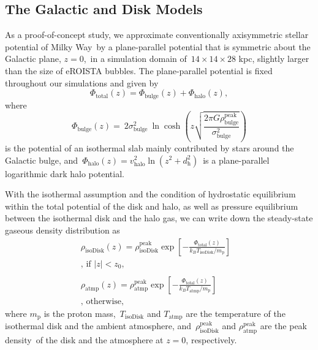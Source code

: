 \documentclass[fleqn,usenatbib,useAMS]{mnras}
\begin{document}
  \subsection{The Galactic and Disk Models} \label{sec:model}
  As a proof-of-concept study, we approximate conventionally axisymmetric stellar potential of Milky Way\
  by a plane-parallel potential that is symmetric about the Galactic plane, $z=0$,\
  in a simulation domain of\
  $14\times14\times28$ kpc, slightly larger than the size of eROISTA bubbles. The plane-parallel potential is fixed throughout our simulations and given by
  \begin{equation}
    \Phi_{\text{total}}(z) = \Phi_{\text{bulge}}(z) + \Phi_{\text{halo}}(z),
  \end{equation}
  where
  \begin{equation}
    \Phi_{\text{bulge}}(z)=\
    2\sigma^2_{\text{bulge}}\
    \ln\cosh\left(z\sqrt{\frac{2\pi G\rho_{\text{bulge}}^{\text{peak}}}{\sigma^2_{\text{bulge}}}}\right)
  \end{equation}
  is the potential of an isothermal slab mainly contributed by stars around the Galactic bulge, and\
  $\Phi_{\text{halo}}(z)=v^2_{\text{halo}}\ln\left(z^2+d^2_{\text{h}}\right)$\
  is a plane-parallel logarithmic dark halo potential.

  With the isothermal assumption and the condition of hydrostatic equilibrium within the total potential of the disk and halo, as well as pressure equilibrium between the isothermal disk and the halo gas, we can write down the steady-state gaseous density distribution as\
  \begin{subequations}
  \begin{align}
     \displaystyle \rho_{\text{isoDisk}}(z) = \rho_{\text{isoDisk}}^{\text{peak}}
     \exp\left[-\frac{\Phi_{\text{total}}(z)}{k_{B}T_{\text{isoDisk}}/m_{\text{p}}}\right]&\label{isothermal-disc-density}\\
     \text{, if $|z| < z_{0}$,}& \nonumber \\
     \nonumber\\
     \displaystyle \rho_{\text{atmp}}(z) = \rho_{\text{atmp}}^{\text{peak}}
     \exp\left[-\frac{\Phi_{\text{total}}(z)}{k_{B}T_{\text{atmp}}/m_{\text{p}}}\right]&\label{isothermal-atmp-density}\\
     \text{, otherwise,}& \nonumber
  \end{align}
  \label{disc-atm-sys}
  \end{subequations}
  where $m_{\text{p}}$ is the proton mass,\
  $T_{\text{isoDisk}}$ and $T_{\text{atmp}}$ are the temperature of the isothermal disk and the ambient atmosphere, and\
  $\rho_{\text{isoDisk}}^{\text{peak}}$ and $\rho_{\text{atmp}}^{\text{peak}}$ are the peak density\
  of the disk and the atmosphere at $z=0$, respectively.
\end{document}
